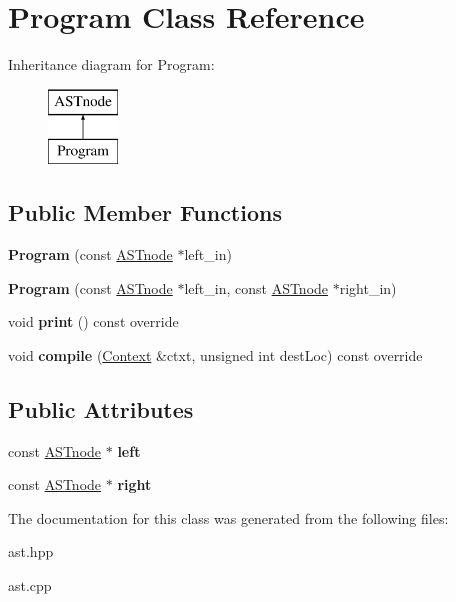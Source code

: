 \hypertarget{class_program}{}\section{Program Class Reference}
\label{class_program}
Inheritance diagram for Program\+:\begin{figure}[H]
\begin{center}
\leavevmode
\includegraphics[height=2.000000cm]{class_program}
\end{center}
\end{figure}
\subsection*{Public Member Functions}
\begin{DoxyCompactItemize}
\item 
\mbox{\label{class_program_a9a5473625b89733ce60dd52ad61a550a}} 
{\bfseries Program} (const \hyperlink{class_a_s_tnode}{A\+S\+Tnode} $\ast$left\+\_\+in)
\item 
\mbox{\label{class_program_a1a53dfe912e66b455561c83100c6613b}} 
{\bfseries Program} (const \hyperlink{class_a_s_tnode}{A\+S\+Tnode} $\ast$left\+\_\+in, const \hyperlink{class_a_s_tnode}{A\+S\+Tnode} $\ast$right\+\_\+in)
\item 
\mbox{\label{class_program_a47be112193d16addb2d5c6d11df28226}} 
void {\bfseries print} () const override
\item 
\mbox{\label{class_program_ac7ff0e76139a2c2b93add868d4fe5cda}} 
void {\bfseries compile} (\hyperlink{class_context}{Context} \&ctxt, unsigned int dest\+Loc) const override
\end{DoxyCompactItemize}
\subsection*{Public Attributes}
\begin{DoxyCompactItemize}
\item 
\mbox{\label{class_program_a993a98af530d1922338cbc49e6bc83d5}} 
const \hyperlink{class_a_s_tnode}{A\+S\+Tnode} $\ast$ {\bfseries left}
\item 
\mbox{\label{class_program_ac9e819c11146c9ad247ddd9bac53c0ff}} 
const \hyperlink{class_a_s_tnode}{A\+S\+Tnode} $\ast$ {\bfseries right}
\end{DoxyCompactItemize}


The documentation for this class was generated from the following files\+:\begin{DoxyCompactItemize}
\item 
ast.\+hpp\item 
ast.\+cpp\end{DoxyCompactItemize}
